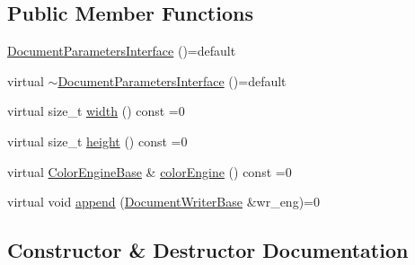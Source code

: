 \subsection*{Public Member Functions}
\begin{DoxyCompactItemize}
\item 
\hyperlink{classGraphicalEditorCore_1_1DocumentParametersInterface_aea8d5f5d01c0046d0bc2adad22487b23}{Document\+Parameters\+Interface} ()=default
\item 
virtual \hyperlink{classGraphicalEditorCore_1_1DocumentParametersInterface_a17f379e6cde775c74283e90d046372e4}{$\sim$\+Document\+Parameters\+Interface} ()=default
\item 
virtual size\+\_\+t \hyperlink{classGraphicalEditorCore_1_1DocumentParametersInterface_a8e96d1aa50d0b2bd3ef21fafaeaa4261}{width} () const =0
\item 
virtual size\+\_\+t \hyperlink{classGraphicalEditorCore_1_1DocumentParametersInterface_a1a3f45e27f2c9b11d04b2fe562323bb2}{height} () const =0
\item 
virtual \hyperlink{classGraphicalEditorCore_1_1ColorEngineBase}{Color\+Engine\+Base} \& \hyperlink{classGraphicalEditorCore_1_1DocumentParametersInterface_aa686512ed2fc7bc504c1ee97ac8e4ad6}{color\+Engine} () const =0
\item 
virtual void \hyperlink{classGraphicalEditorCore_1_1DocumentParametersInterface_a0f00de40222b9f5176e2cf6d4e9ae4c9}{append} (\hyperlink{classGraphicalEditorCore_1_1DocumentWriterBase}{Document\+Writer\+Base} \&wr\+\_\+eng)=0
\end{DoxyCompactItemize}


\subsection{Constructor \& Destructor Documentation}
